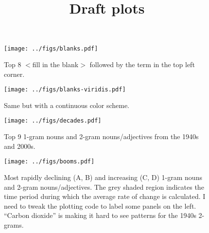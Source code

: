 \documentclass[12pt]{article}
\title{Draft plots}
\author{}
\begin{document}
\maketitle





\clearpage


% 

\begin{figure}[htbp]
\centering
\texttt{[image: ../figs/blanks.pdf]}
\caption{Top 8 $<$fill in the blank$>$ followed by the term in the top left corner.}
\end{figure}

\clearpage


\begin{figure}[htbp]
\centering
\texttt{[image: ../figs/blanks-viridis.pdf]}
\caption{Same but with a continuous color scheme.}
\end{figure}

\clearpage

%



\begin{figure}[htbp]
\centering
\texttt{[image: ../figs/decades.pdf]}
\caption{Top 9 1-gram nouns and 2-gram nouns/adjectives from the 1940s and 2000s.}
\end{figure}

\clearpage

\begin{figure}[htbp]
\centering
\texttt{[image: ../figs/booms.pdf]}
\caption{Most rapidly declining (A, B) and increasing (C, D) 1-gram nouns and 2-gram nouns/adjectives. The grey shaded region indicates the time period during which the average rate of change is calculated. I need to tweak the plotting code to label some panels on the left. ``Carbon dioxide'' is making it hard to see patterns for the 1940s 2-grams.}
\end{figure}
\end{document}
